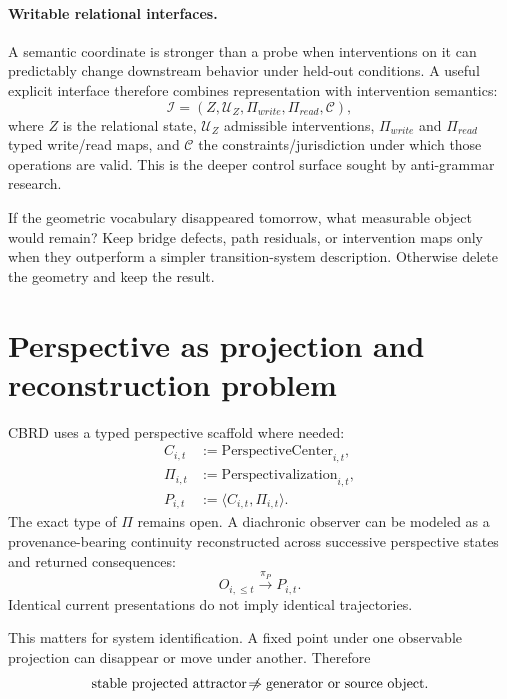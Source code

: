 \paragraph{Writable relational interfaces.}
A semantic coordinate is stronger than a probe when interventions on it can predictably change downstream behavior under held-out conditions. A useful explicit interface therefore combines representation with intervention semantics:
\begin{equation}
\mathcal I=(Z,\mathcal U_Z,\Pi_{write},\Pi_{read},\mathcal C),
\label{eq:deep-interface}
\end{equation}
where $Z$ is the relational state, $\mathcal U_Z$ admissible interventions, $\Pi_{write}$ and $\Pi_{read}$ typed write/read maps, and $\mathcal C$ the constraints/jurisdiction under which those operations are valid. This is the deeper control surface sought by anti-grammar research.

\begin{readercheck}
If the geometric vocabulary disappeared tomorrow, what measurable object would remain? Keep bridge defects, path residuals, or intervention maps only when they outperform a simpler transition-system description. Otherwise delete the geometry and keep the result.
\end{readercheck}

\section{Perspective as projection and reconstruction problem}

CBRD uses a typed perspective scaffold where needed:
\begin{align}
C_{i,t}&:=\mathrm{PerspectiveCenter}_{i,t},\\
\Pi_{i,t}&:=\mathrm{Perspectivalization}_{i,t},\\
P_{i,t}&:=\langle C_{i,t},\Pi_{i,t}\rangle.
\end{align}
The exact type of $\Pi$ remains open. A diachronic observer can be modeled as a provenance-bearing continuity reconstructed across successive perspective states and returned consequences:
\begin{equation}
O_{i,\le t}\xrightarrow{\pi_P}P_{i,t}.
\end{equation}
Identical current presentations do not imply identical trajectories.

This matters for system identification. A fixed point under one observable projection can disappear or move under another. Therefore
\begin{equation}
\text{stable projected attractor}\mathrel{\not\!\Rightarrow}\text{generator or source object}.
\end{equation}

